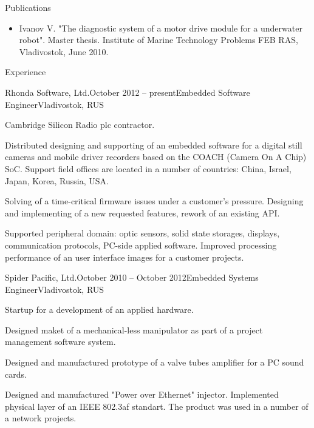 \documentclass{template}
\begin{document}

\begin{rSection}{Publications}

\begin{itemize}
\item Ivanov V. "The diagnostic system of a motor drive module for a underwater robot". Master thesis. Institute of Marine Technology Problems FEB RAS, Vladivostok, June 2010.
\end{itemize}

\end{rSection}


\begin{rSection}{Experience}

\begin{rSubsection}{Rhonda Software, Ltd.}{October 2012 -- present}{Embedded Software Engineer}{Vladivostok, RUS}
\item Cambridge Silicon Radio plc contractor.
\item Distributed designing and supporting of an embedded software for a digital still cameras and mobile driver recorders based on the COACH (Camera On A Chip) SoC. Support field offices are located in a number of countries: China, Israel, Japan, Korea, Russia, USA.
\item Solving of a time-critical firmware issues under a customer's pressure. Designing and implementing of a new requested features, rework of an existing API.
\item Supported peripheral domain: optic sensors, solid state storages, displays, communication protocols, PC-side applied software. Improved processing performance of an user interface images for a customer projects.
\end{rSubsection}

\begin{rSubsection}{Spider Pacific, Ltd.}{October 2010 -- October 2012}{Embedded Systems Engineer}{Vladivostok, RUS}
\item Startup for a development of an applied hardware.
\item Designed maket of a mechanical-less manipulator as part of a project management software system.
\item Designed and manufactured prototype of a valve tubes amplifier for a PC sound cards.
\item Designed and manufactured "Power over Ethernet" injector. Implemented physical layer of an IEEE 802.3af standart. The product was used in a number of a network projects.
\end{rSubsection}

\end{rSection}
\end{document}
